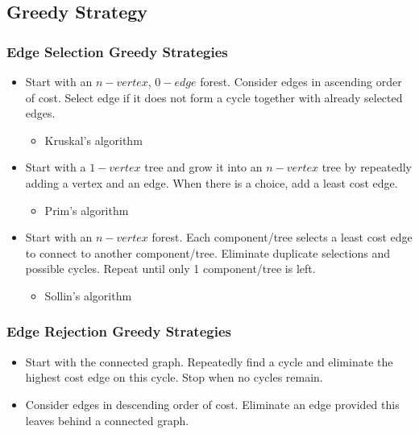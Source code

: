 \documentclass[newPxFont,sthlmFooter,nooffset]{beamer}
\begin{document}
\subsection{Greedy Strategy}
\begin{frame}[t]
  \frametitle{Edge Selection Greedy Strategies}
  \begin{itemize}
  \item Start with an $n-vertex$, $0-edge$ forest. Consider edges in ascending order of cost. Select edge if it does not form a cycle together with already selected edges.
    \begin{itemize}
    \item Kruskal's algorithm
    \end{itemize}

\item Start with a $1-vertex$ tree and grow it into an $n-vertex$ tree by repeatedly adding a vertex and an edge. When there is a choice, add a least cost edge.
  \begin{itemize}
  \item Prim's algorithm
  \end{itemize}
\item Start with an $n-vertex$ forest. Each component/tree selects a least cost edge to connect to another component/tree. Eliminate duplicate selections and possible cycles. Repeat until only 1 component/tree is left.
  \begin{itemize}
  \item Sollin's algorithm
  \end{itemize}

  \end{itemize}
\end{frame}


\begin{frame}[t]
  \frametitle{Edge Rejection Greedy Strategies}
  \begin{itemize}
  \item Start with the connected graph. Repeatedly find a cycle and eliminate the highest cost edge on this cycle. Stop when no cycles remain.
  \item Consider edges in descending order of cost. Eliminate an edge provided this leaves behind a connected graph.
  \end{itemize}
\end{frame}
\end{document}

